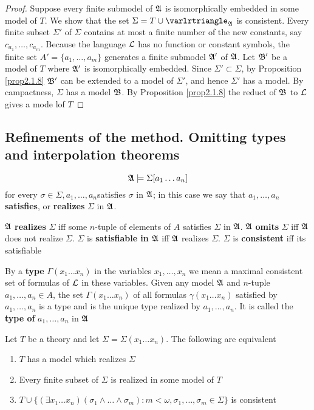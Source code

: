 \documentclass[11pt]{article}
\begin{document}
\begin{proof}
Suppose every finite submodel of \(\mathfrak{A}\) is isomorphically embedded in some
model of \(T\). We show that the set \(\Sigma=T\cup\varlrtriangle_{\fA}\) is
consistent. Every finite subset \(\Sigma'\) of \(\Sigma\) contains at most a finite
number of the new constants, say \(c_{a_1},\dots,c_{a_m}\). Because the
language \(\mathcal{L}\) has no function or constant symbols, the finite set
\(A'=\{a_1,\dots,a_m\}\) generates a finite submodel \(\mathfrak{A}'\) of \(\mathfrak{A}\). Let
\(\mathfrak{B}'\) be a model of \(T\) where \(\mathfrak{A}'\) is isomorphically embedded. Since
\(\Sigma'\subset\Sigma\), by Proposition \ref{prop2.1.8} \(\mathfrak{B}'\) can be
extended to a model of \(\Sigma'\), and hence \(\Sigma'\) has a model. By
campactness, \(\Sigma\) has a model \(\mathfrak{B}\). By Proposition \ref{prop2.1.8} the reduct
of \(\mathfrak{B}\) to \(\mathcal{L}\) gives a mode lof \(T\)
\end{proof}

\subsection{Refinements of the method. Omitting types and interpolation theorems}
\label{sec:orgb7029bc}
\begin{equation*}
\mathfrak{A}\models\Sigma[a_1\dots a_n]
\end{equation*}
for every \(\sigma\in\Sigma,a_1,\dots,a_n\)satisfies \(\sigma\) in \(\mathfrak{A}\); in this
case we say that \(a_1,\dots,a_n\) \textbf{satisfies}, or \textbf{realizes} \(\Sigma\) in \(\mathfrak{A}\).

\(\mathfrak{A}\) \textbf{realizes} \(\Sigma\) iff some \(n\)-tuple of elements of \(A\) satisfies
\(\Sigma\) in \(\mathfrak{A}\). \(\mathfrak{A}\) \textbf{omits} \(\Sigma\) iff \(\mathfrak{A}\) does not realize \(\Sigma\).
\(\Sigma\) is \textbf{satisfiable in \(\mathfrak{A}\)} iff \(\mathfrak{A}\) realizes \(\Sigma\). \(\Sigma\) is \textbf{consistent} iff its satisfiable

By a \textbf{type} \(\Gamma(x_1\dots x_n)\) in the variables \(x_1,\dots,x_n\) we mean a
maximal consistent set of formulas of \(\mathcal{L}\) in these variables. Given any
model \(\mathfrak{A}\) and \(n\)-tuple \(a_1,\dots,a_n\in A\), the set \(\Gamma(x_1\dots
   x_n)\) of all formulas \(\gamma(x_1\dots x_n)\) satisfied by \(a_1,\dots,a_n\) is
a type and is the unique type realized by \(a_1,\dots,a_n\). It is called the
\textbf{type of} \(a_1,\dots,a_n\) in \(\mathfrak{A}\)

\begin{proposition}[]
Let \(T\) be a theory and let \(\Sigma=\Sigma(x_1\dots x_n)\). The following
are equivalent
\begin{enumerate}
\item \(T\) has a model which realizes \(\Sigma\)
\item Every finite subset of \(\Sigma\) is realized in some model of \(T\)
\item \(T\cup\{(\exists x_1\dots x_n)(\sigma_1\wedge\dots\wedge
      \sigma_m):m<\omega,\sigma_1,\dots,\sigma_m\in\Sigma\}\) is consistent
\end{enumerate}
\end{proposition}
\end{document}
